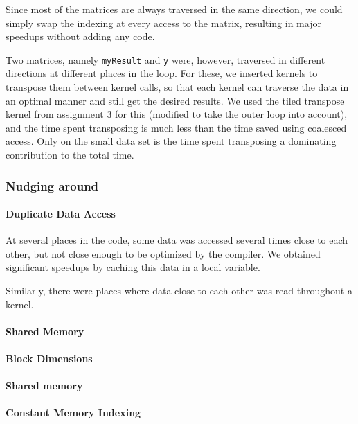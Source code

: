 \documentclass[11pt]{article}
\begin{document}
Since most of the matrices are always traversed in the same direction, we could simply swap the indexing at every access to the matrix, resulting in major speedups without adding any code.

Two matrices, namely \texttt{myResult} and \texttt{y} were, however, traversed in different directions at different places in the loop.
For these, we inserted kernels to transpose them between kernel calls, so that each kernel can traverse the data in an optimal manner and still get the desired results.
We used the tiled transpose kernel from assignment 3 for this (modified to take the outer loop into account), and the time spent transposing is much less than the time saved using coalesced access.
Only on the small data set is the time spent transposing a dominating contribution to the total time.


\subsubsection{Nudging around}

\paragraph{Duplicate Data Access\\}
At several places in the code, some data was accessed several times close to each other, but not close enough to be optimized by the compiler.
We obtained significant speedups by caching this data in a local variable.

Similarly, there were places where data close to each other was read throughout a kernel.

\paragraph{Shared Memory\\}
\paragraph{Block Dimensions\\}
\paragraph{Shared memory\\}
\paragraph{Constant Memory Indexing\\}
\end{document}
